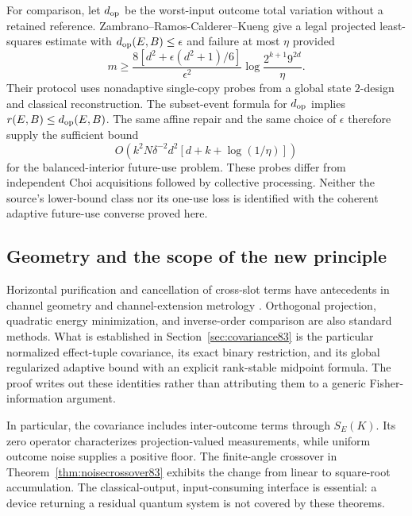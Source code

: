 For comparison, let $d_{\rm op}$ be the worst-input outcome total
variation without a retained reference.  Zambrano--Ramos-Calderer--Kueng
\cite[Theorem~2]{ZRK76} give a legal projected least-squares estimate
with $d_{\rm op}(E,B)\le\epsilon$ and failure at most $\eta$ provided
\begin{equation}\label{eq:zrkexact83}
 m\ge\frac{8[d^2+\epsilon(d^2+1)/6]}{\epsilon^2}
       \log\frac{2^{k+1}9^{2d}}{\eta}.
\end{equation}
Their protocol uses nonadaptive single-copy probes from a global
state $2$-design and classical reconstruction.  The subset-event
formula for $d_{\rm op}$ implies $r(E,B)\le d_{\rm op}(E,B)$.
The same affine repair and the same choice of $\epsilon$ therefore
supply the sufficient bound
\begin{equation}\label{eq:zrkfuture83}
 O\!\left(k^2N\delta^{-2}d^2[d+k+\log(1/\eta)]\right)
\end{equation}
for the balanced-interior future-use problem.  These probes differ
from independent Choi acquisitions followed by collective processing.
Neither the source's lower-bound class nor its one-use loss is
identified with the coherent adaptive future-use converse proved here.

\subsection{Geometry and the scope of the new principle}
Horizontal purification and cancellation of cross-slot terms have
antecedents in channel geometry and channel-extension metrology
\cite{FI76,DKG67,KGAD76,YF76,SD76}.  Orthogonal projection, quadratic
energy minimization, and inverse-order comparison are also standard
methods.  What is established in Section~\ref{sec:covariance83} is
the particular normalized effect-tuple covariance, its exact binary
restriction, and its global regularized adaptive bound with an explicit
rank-stable midpoint formula.  The proof writes out these identities
rather than attributing them to a generic Fisher-information argument.

In particular, the covariance includes inter-outcome terms through
$S_E(K)$.  Its zero operator characterizes projection-valued
measurements, while uniform outcome noise supplies a positive floor.
The finite-angle crossover in Theorem~\ref{thm:noisecrossover83}
exhibits the change from linear to square-root accumulation.  The
classical-output, input-consuming interface is essential: a device
returning a residual quantum system is not covered by these theorems.

